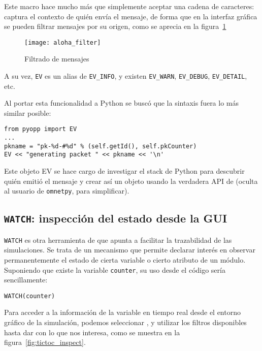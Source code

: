 Este macro hace mucho más que simplemente aceptar una cadena de caracteres:
captura el contexto de quién envía el mensaje, de forma que en la interfaz
gráfica se pueden filtrar mensajes por su origen, como se aprecia en la
figura~\ref{fig:aloha_filter}

\begin{figure}[h]
\caption{Filtrado de mensajes}
\label{fig:aloha_filter}
\centering
\texttt{[image: aloha\_filter]}
\end{figure}


A su vez, \verb!EV! es un alias de \verb!EV_INFO!, y existen \verb!EV_WARN!,
\verb!EV_DEBUG!, \verb!EV_DETAIL!, etc.

Al portar esta funcionalidad a Python se buscó que la sintaxis fuera lo más
similar posible:

\begin{verbatim}
from pyopp import EV
...
pkname = "pk-%d-#%d" % (self.getId(), self.pkCounter)
EV << "generating packet " << pkname << '\n'
\end{verbatim}

Este objeto EV se hace cargo de investigar el stack de Python para descubrir
quién emitió el mensaje y crear así un objeto usando la verdadera API de
\omnetpp{} (oculta al usuario de \verb!omnetpy!, para simplificar).

\subsection{\texttt{WATCH}: inspección del estado desde la GUI}

\verb!WATCH! es otra herramienta de \omnetpp{} que apunta a facilitar la
trazabilidad de las simulaciones. Se trata de un mecanismo que permite declarar
interés en observar permanentemente el estado de cierta variable o cierto
atributo de un módulo. Suponiendo que existe la variable \verb!counter!, su uso
desde el código sería sencillamente:

\begin{verbatim}
WATCH(counter)
\end{verbatim}

Para acceder a la información de la variable en tiempo real desde el entorno
gráfico de la simulación, podemos seleccionar , y utilizar los filtros disponibles hasta dar con lo que nos
interesa, como se muestra en la figura~\ref{fig:tictoc_inspect}.

